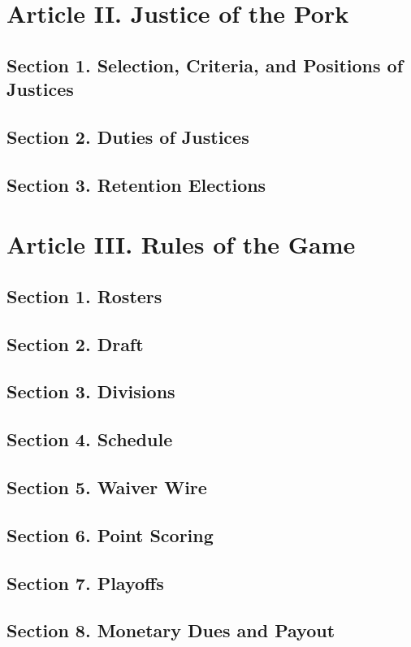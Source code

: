\documentclass{article}
\begin{document}
\section{Article II. Justice of the Pork}
    \subsection*{Section 1. Selection, Criteria, and Positions of Justices}
    \subsection*{Section 2. Duties of Justices}
    \subsection*{Section 3. Retention Elections}

\section{Article III. Rules of the Game}
    \subsection*{Section 1. Rosters}
    \subsection*{Section 2. Draft}
    \subsection*{Section 3. Divisions}
    \subsection*{Section 4. Schedule}
    \subsection*{Section 5. Waiver Wire}
    \subsection*{Section 6. Point Scoring}
    \subsection*{Section 7. Playoffs}
    \subsection*{Section 8. Monetary Dues and Payout}
\end{document}
